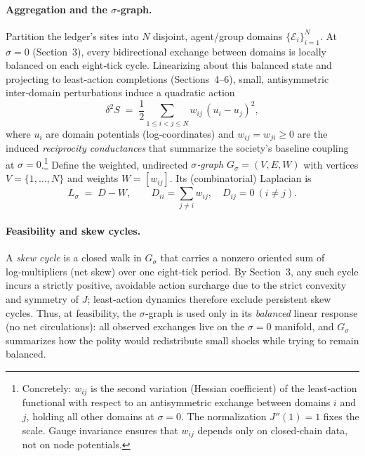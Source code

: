 \documentclass[11pt]{article}
\begin{document}
\paragraph{Aggregation and the $\sigma$‑graph.}
Partition the ledger’s sites into $N$ disjoint, agent/group domains $\{\mathcal E_i\}_{i=1}^N$. At $\sigma\!=\!0$ (Section~3), every bidirectional exchange between domains is locally balanced on each eight‑tick cycle. Linearizing about this balanced state and projecting to least‑action completions (Sections~4–6), small, antisymmetric inter‑domain perturbations induce a quadratic action
\[
\delta^2 S \;=\; \frac{1}{2}\sum_{1\le i<j\le N} w_{ij}\,(u_i-u_j)^2,
\]
where $u_i$ are domain potentials (log‑coordinates) and $w_{ij}=w_{ji}\ge 0$ are the induced \emph{reciprocity conductances} that summarize the society’s baseline coupling at $\sigma\!=\!0$.\footnote{Concretely: $w_{ij}$ is the second variation (Hessian coefficient) of the least‑action functional with respect to an antisymmetric exchange between domains $i$ and $j$, holding all other domains at $\sigma\!=\!0$. The normalization $J''(1)=1$ fixes the scale. Gauge invariance ensures that $w_{ij}$ depends only on closed‑chain data, not on node potentials.} Define the weighted, undirected \emph{$\sigma$‑graph} $G_\sigma=(V,E,W)$ with vertices $V=\{1,\dots,N\}$ and weights $W=[w_{ij}]$. Its (combinatorial) Laplacian is
\[
L_\sigma \;=\; D-W, \qquad D_{ii}=\sum_{j\neq i}w_{ij},\quad D_{ij}=0\ (i\neq j).
\]

\paragraph{Feasibility and skew cycles.}
A \emph{skew cycle} is a closed walk in $G_\sigma$ that carries a nonzero oriented sum of log‑multipliers (net skew) over one eight‑tick period. By Section~3, any such cycle incurs a strictly positive, avoidable action surcharge due to the strict convexity and symmetry of $J$; least‑action dynamics therefore exclude persistent skew cycles. Thus, at feasibility, the $\sigma$‑graph is used only in its \emph{balanced} linear response (no net circulations): all observed exchanges live on the $\sigma\!=\!0$ manifold, and $G_\sigma$ summarizes how the polity would redistribute small shocks while trying to remain balanced.
\end{document}
